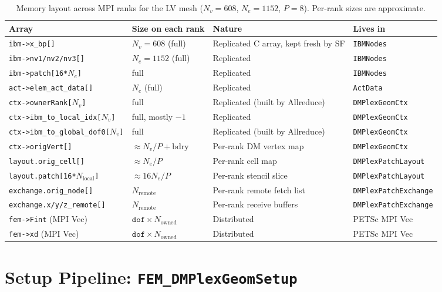 \documentclass[11pt]{article}
\begin{document}
\begin{table}[h]
\centering
\begin{tabular}{llll}
\toprule
Array & Size on each rank & Nature & Lives in \\
\midrule
\texttt{ibm->x\_bp[]} & $N_v = 608$ (full) & Replicated C array, kept fresh by SF & \texttt{IBMNodes} \\
\texttt{ibm->nv1/nv2/nv3[]} & $N_e = 1152$ (full) & Replicated & \texttt{IBMNodes} \\
\texttt{ibm->patch[16*$N_e$]} & full & Replicated & \texttt{IBMNodes} \\
\texttt{act->elem\_act\_data[]} & $N_e$ (full) & Replicated & \texttt{ActData} \\
\texttt{ctx->ownerRank[$N_v$]} & full & Replicated (built by Allreduce) & \texttt{DMPlexGeomCtx} \\
\texttt{ctx->ibm\_to\_local\_idx[$N_v$]} & full, mostly $-1$ & Replicated & \texttt{DMPlexGeomCtx} \\
\texttt{ctx->ibm\_to\_global\_dof0[$N_v$]} & full & Replicated (built by Allreduce) & \texttt{DMPlexGeomCtx} \\
\midrule
\texttt{ctx->origVert[]} & $\approx N_v/P + \text{bdry}$ & Per-rank DM vertex map & \texttt{DMPlexGeomCtx} \\
\texttt{layout.orig\_cell[]} & $\approx N_e/P$ & Per-rank cell map & \texttt{DMPlexPatchLayout} \\
\texttt{layout.patch[16*$N_\text{local}$]} & $\approx 16 N_e/P$ & Per-rank stencil slice & \texttt{DMPlexPatchLayout} \\
\texttt{exchange.orig\_node[]} & $N_\text{remote}$ & Per-rank remote fetch list & \texttt{DMPlexPatchExchange} \\
\texttt{exchange.x/y/z\_remote[]} & $N_\text{remote}$ & Per-rank receive buffers & \texttt{DMPlexPatchExchange} \\
\midrule
\texttt{fem->Fint} (MPI Vec) & $\texttt{dof} \times N_\text{owned}$ & Distributed & PETSc MPI Vec \\
\texttt{fem->xd} (MPI Vec) & $\texttt{dof} \times N_\text{owned}$ & Distributed & PETSc MPI Vec \\
\bottomrule
\end{tabular}
\caption{Memory layout across MPI ranks for the LV mesh ($N_v=608$, $N_e=1152$, $P=8$).
Per-rank sizes are approximate.}
\label{tab:memory}
\end{table}

\section{Setup Pipeline: \texttt{FEM\_DMPlexGeomSetup}}
\end{document}
